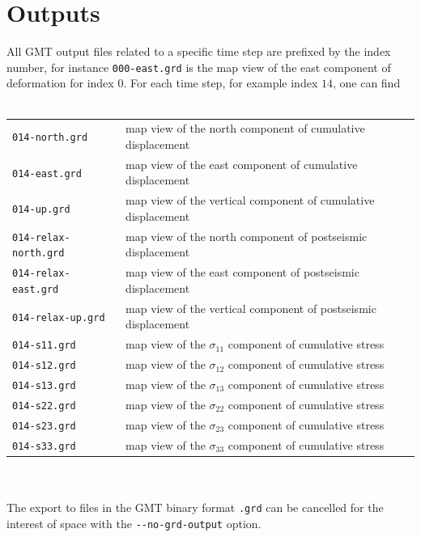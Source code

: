 \documentclass[10pt]{article}
\begin{document}
\section{Outputs}

All GMT output files related to a specific time step are prefixed by the index number, for instance \verb'000-east.grd' is the map view of the east component of deformation for index $0$. For each time step, for example index $14$, one can find\\
\\
\begin{tabular}{ll}
\verb'014-north.grd' & map view of the north component of cumulative displacement\\
\verb'014-east.grd' & map view of the east component of cumulative displacement\\
\verb'014-up.grd' & map view of the vertical component of cumulative displacement\\
\verb'014-relax-north.grd' & map view of the north component of postseismic displacement\\
\verb'014-relax-east.grd' & map view of the east component of postseismic displacement\\
\verb'014-relax-up.grd' & map view of the vertical component of postseismic displacement\\
\verb'014-s11.grd' & map view of the $\sigma_{11}$ component of cumulative stress\\
\verb'014-s12.grd' & map view of the $\sigma_{12}$ component of cumulative stress\\
\verb'014-s13.grd' & map view of the $\sigma_{13}$ component of cumulative stress\\
\verb'014-s22.grd' & map view of the $\sigma_{22}$ component of cumulative stress\\
\verb'014-s23.grd' & map view of the $\sigma_{23}$ component of cumulative stress\\
\verb'014-s33.grd' & map view of the $\sigma_{33}$ component of cumulative stress\\
\end{tabular}\\
\\
The export to files in the GMT binary format \verb'.grd' can be cancelled for the interest of space with the \verb'--no-grd-output' option.
\end{document}
